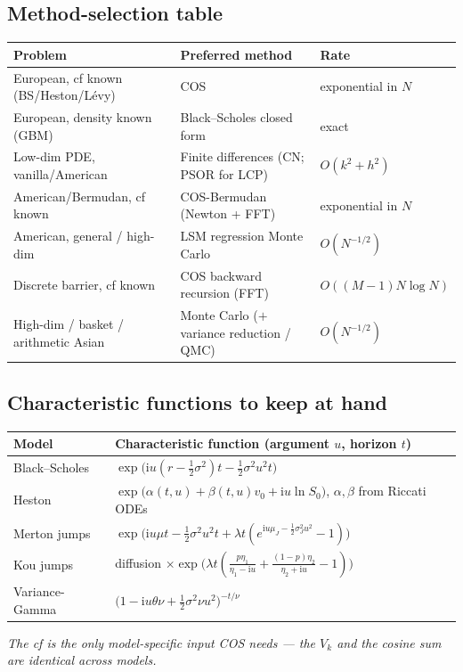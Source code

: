 \documentclass[11pt]{article}
\newcommand{\ii}{\mathrm{i}}
\begin{document}
\subsection*{Method-selection table}
\begin{center}\small
\renewcommand{\arraystretch}{1.25}
\begin{tabular}{>{\raggedright\arraybackslash}p{4.7cm} >{\raggedright\arraybackslash}p{6.4cm} l}
\toprule
\textbf{Problem} & \textbf{Preferred method} & \textbf{Rate} \\
\midrule
European, cf known (BS/Heston/L\'evy) & COS & exponential in $N$ \\
European, density known (GBM) & Black--Scholes closed form & exact \\
Low-dim PDE, vanilla/American & Finite differences (CN; PSOR for LCP) & $O(k^2+h^2)$ \\
American/Bermudan, cf known & COS-Bermudan (Newton + FFT) & exponential in $N$ \\
American, general / high-dim & LSM regression Monte Carlo & $O(N^{-1/2})$ \\
Discrete barrier, cf known & COS backward recursion (FFT) & $O((M{-}1)N\log N)$ \\
High-dim / basket / arithmetic Asian & Monte Carlo ($+$ variance reduction / QMC) & $O(N^{-1/2})$ \\
\bottomrule
\end{tabular}
\end{center}

\subsection*{Characteristic functions to keep at hand}
\begin{center}\small
\renewcommand{\arraystretch}{1.5}
\begin{tabular}{l l}
\toprule
\textbf{Model} & \textbf{Characteristic function} (argument $u$, horizon $t$)\\
\midrule
Black--Scholes & $\exp\!\big(\ii u(r-\tfrac12\sigma^2)t-\tfrac12\sigma^2u^2t\big)$\\
Heston & $\exp\!\big(\alpha(t,u)+\beta(t,u)v_0+\ii u\ln S_0\big)$, $\alpha,\beta$ from Riccati ODEs\\
Merton jumps & $\exp\!\big(\ii u\mu t-\tfrac12\sigma^2u^2t+\lambda t(e^{\ii u\mu_J-\frac12\sigma_J^2u^2}-1)\big)$\\
Kou jumps & diffusion $\times\exp\!\big(\lambda t(\tfrac{p\eta_1}{\eta_1-\ii u}+\tfrac{(1-p)\eta_2}{\eta_2+\ii u}-1)\big)$\\
Variance-Gamma & $\big(1-\ii u\theta\nu+\tfrac12\sigma^2\nu u^2\big)^{-t/\nu}$\\
\bottomrule
\end{tabular}
\end{center}
\smallskip
\noindent\emph{The cf is the only model-specific input COS needs --- the $V_k$ and the cosine sum are identical
across models.}
\end{document}

